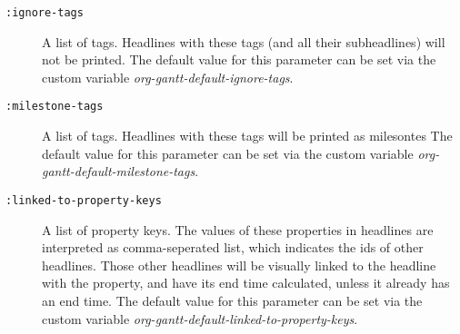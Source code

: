 \documentclass[11pt]{article}
\begin{document}
\begin{description}
\item[{\texttt{:ignore-tags}}] A list of tags. Headlines with these tags (and all their subheadlines) will not be printed. The default value for this parameter can be set via the custom variable \emph{org-gantt-default-ignore-tags}.
\item[{\texttt{:milestone-tags}}] A list of tags. Headlines with these tags will be printed as milesontes The default value for this parameter can be set via the custom variable \emph{org-gantt-default-milestone-tags}.
\item[{\texttt{:linked-to-property-keys}}] A list of property keys. The values of these properties in headlines are interpreted as comma-seperated list, which indicates the ids of other headlines. Those other headlines will be visually linked to the headline with the property, and have its end time calculated, unless it already has an end time. The default value for this parameter can be set via the custom variable \emph{org-gantt-default-linked-to-property-keys}.
\end{description}
\end{document}
